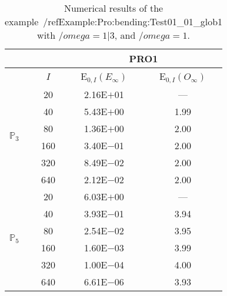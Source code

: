 \begin{table}[H]
\caption{Numerical results of the example~/ref{Example:Pro:bending:Test01_01_glob1} with $/omega=1|3$, and $/omega=1$.}
\setlength{\tabcolsep}{5pt}
\centering
\begin{tabular}{@{}l c c c@{}}
\toprule
 &  & \multicolumn{2}{c}{PRO1}\\
\midrule
 & $I$ & E$_{0,I}(E_{\infty})$ & E$_{0,I}(O_{\infty})$\\
\midrule
\multirow{6}{*}{$\mathbb{P}_{3}$}
 & 20 & 2.16E$+$01 & ---\\
 & 40 & 5.43E$+$00 & 1.99\\
 & 80 & 1.36E$+$00 & 2.00\\
 & 160 & 3.40E$-$01 & 2.00\\
 & 320 & 8.49E$-$02 & 2.00\\
 & 640 & 2.12E$-$02 & 2.00\\
\midrule
\multirow{6}{*}{$\mathbb{P}_{5}$}
 & 20 & 6.03E$+$00 & ---\\
 & 40 & 3.93E$-$01 & 3.94\\
 & 80 & 2.54E$-$02 & 3.95\\
 & 160 & 1.60E$-$03 & 3.99\\
 & 320 & 1.00E$-$04 & 4.00\\
 & 640 & 6.61E$-$06 & 3.93\\
\bottomrule
\end{tabular}
\label{Table:PRO:test_01_01_test32_pro1}
\end{table}
